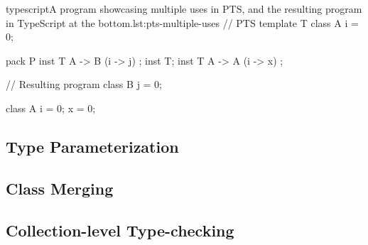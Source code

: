 \begin{code}{typescript}{A program showcasing multiple uses in PTS, and the resulting program in TypeScript at the bottom.}{lst:pts-multiple-uses}
    // PTS
    template T {
        class A {
            i = 0;
        }
    }

    pack P {
        inst T { A -> B (i -> j) };
        inst T;
        inst T { A -> A (i -> x) };
    }

    // Resulting program
    class B {
        j = 0;
    }

    class A {
        i = 0;
        x = 0;
    }
\end{code}

\subsection{Type Parameterization}

\subsection{Class Merging}

\subsection{Collection-level Type-checking}

